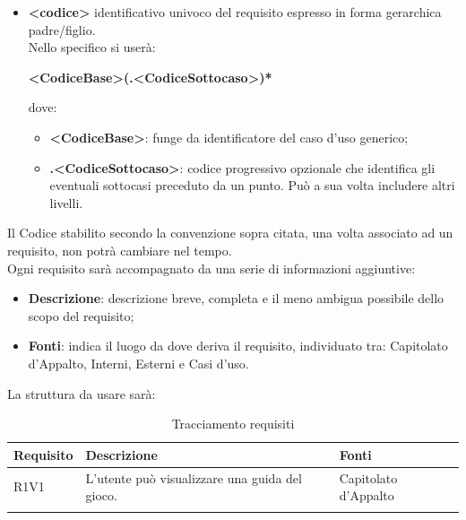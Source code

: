 \begin{itemize}
                        
                    \item\textbf{<codice>} identificativo univoco del requisito espresso in forma gerarchica padre/figlio. \\
                        Nello specifico si userà:\\
                        \begin{center}
                            \textbf{<CodiceBase>(.<CodiceSottocaso>)*}
                        \end{center}
                        dove:
                        \begin{itemize}
                            \item\textbf{<CodiceBase>}: funge da identificatore del caso d’uso generico;
                            \item\textbf{.<CodiceSottocaso>}: codice progressivo opzionale che identifica gli eventuali sottocasi preceduto da un punto. Può a sua volta includere altri livelli.
                        \end{itemize}
                \end{itemize}
                Il Codice stabilito secondo la convenzione sopra citata, una volta associato ad un requisito, non potrà cambiare nel tempo. \\
                Ogni requisito sarà accompagnato da una serie di informazioni aggiuntive:\\
                \begin{itemize}
                    \item\textbf{Descrizione}: descrizione breve, completa e il meno ambigua possibile dello scopo del requisito;
                    \item\textbf{Fonti}: indica il luogo da dove deriva il requisito, individuato tra: Capitolato d’Appalto,  Interni,  Esterni e Casi d’uso.
                \end{itemize}
                La struttura da usare sarà:
                \begin{center}
                    \begin{longtable}{|p{4.5cm}|p{4.5cm}|p{4.5cm}|}
                        \hline
                        \rowcolor{lighter-grayer}
                        \textbf{Requisito} & \textbf{Descrizione} & \textbf{Fonti}\\
                        \hline
                        \endfirsthead
                        R1V1 & L’utente può visualizzare una guida del gioco. & Capitolato d'Appalto  \\
                        \caption{Tracciamento requisiti}
                        \label{Tracciamento requisiti}
                    \end{longtable}
                \end{center}
